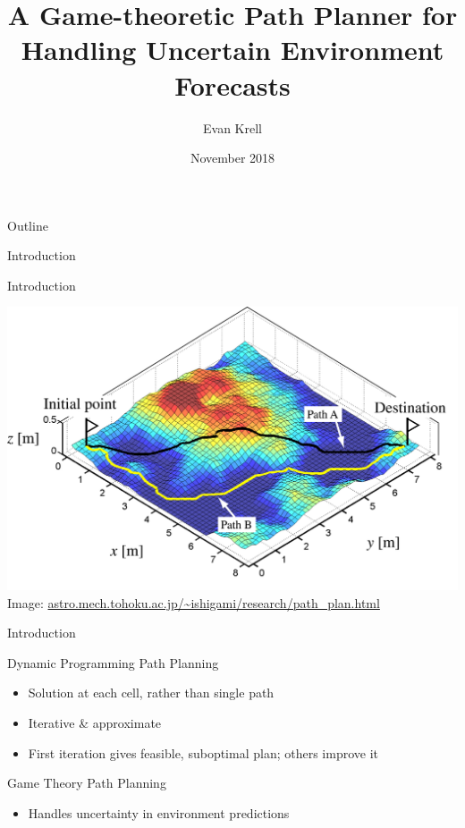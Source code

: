 \documentclass[xcolor=table, 9pt]{beamer}
\title[PPT - Game Theory Path Planner]{A Game-theoretic Path Planner for Handling Uncertain Environment Forecasts}
\author{Evan Krell}
\institute{Texas A\&M University - Corpus Christi}
\date{November 2018}
\begin{document}
\begin{frame}
  \titlepage
\end{frame}

\begin{frame}{Outline}
  \tableofcontents
\end{frame}

\begin{section}{Introduction}
    \begin{frame}{Introduction}
        \begin{center}
            \includegraphics[width=\textwidth,trim={0cm 0cm 0cm 0cm},clip]{img/path.jpg} \\
            Image: \url{astro.mech.tohoku.ac.jp/~ishigami/research/path_plan.html}
        \end{center}        
    \end{frame}
    \begin{frame}{Introduction}
        \begin{block}{Dynamic Programming Path Planning}
            \begin{itemize}
                \item Solution at each cell, rather than single path
                \item Iterative \& approximate
                \item First iteration gives feasible, suboptimal plan; others improve it
            \end{itemize}
        \end{block}
        \begin{block}{Game Theory Path Planning}
            \begin{itemize}
                \item Handles uncertainty in environment predictions

\end{itemize}
\end{block}
\end{frame}
\end{section}
\end{document}
